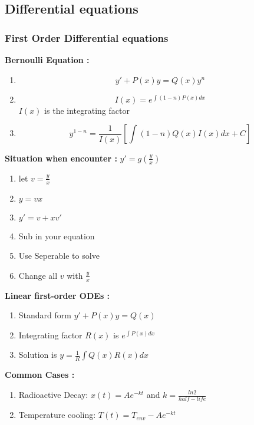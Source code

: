 \subsection{Differential equations}
\subsubsection{First Order Differential equations}
\textbf{Bernoulli Equation :}
\begin{enumerate} 
    \item\[y'+ P(x)y = Q(x) y^n\]
    \item\[I(x)= e^{\int(1-n)P(x)dx}\]
$I(x)$ is the integrating factor
    \item\[y^{1-n}=\frac{1}{I(x)}\left[\int(1-n)Q(x)I(x)dx + C\right]\]
\end{enumerate}
\textbf{Situation when encounter :} $y'=g(\frac{y}{x})$
\begin{enumerate}
    \item let $v=\frac{y}{x}$
    \item $y = vx$
    \item $y'=v+xv'$
    \item Sub in your equation
    \item Use Seperable to solve
    \item Change all $v$ with $\frac{y}{x}$
\end{enumerate}
\textbf{Linear first-order ODEs :}
\begin{enumerate}
    \item Standard form $y'+P(x)y=Q(x)$
    \item Integrating factor $R(x)$ is $e^{\int{P(x)dx}}$
    \item Solution is $y = \frac{1}{R}\int{Q(x)R(x)}dx$
\end{enumerate}
\textbf{Common Cases :}
\begin{enumerate}
    \item Radioactive Decay: $x(t)=Ae^{-kt}$ and $k=\frac{ln2}{half-life}$
    \item Temperature cooling: $T(t)=T_{env}-Ae^{-kt}$
\end{enumerate}